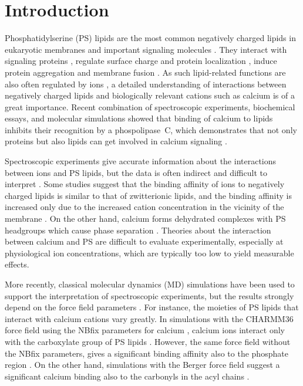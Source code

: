 \documentclass[journal=jctcce,manuscript=article]{achemso}
\begin{document}
 
 
\section{Introduction} 

Phosphatidylserine (PS) lipids are the most common negatively charged lipids in eukaryotic membranes
and important signaling molecules \cite{lemmon08,leventis10,li14}.
They interact with signaling proteins \cite{leventis10},
regulate surface charge and protein localization \cite{yeung08}, 
induce protein aggregation \cite{zhao04,gorbenko06} and membrane fusion \cite{wilschut1981calcium, papahadjopoulos90, verma2018cell}.
As such lipid-related functions are also often regulated by ions \cite{leventis10},
a detailed understanding of interactions between negatively charged lipids and biologically relevant cations such as calcium is of a great importance.
Recent combination of spectroscopic experiments, biochemical essays, and molecular simulations showed that binding of
calcium to  lipids inhibits their recognition by a phospolipase~C, 
which demonstrates that not only proteins but also lipids can get involved in calcium signaling \cite{Bilkova2017Calcium}.

Spectroscopic experiments give accurate information about the
interactions between ions and PS lipids, but the data is often indirect and difficult to
interpret \cite{hauser77,kurland79,eisenberg79,hauser83,dluhy83,hauser85,feigenson86,mattai89,roux90,roux91}.
Some studies suggest that the
binding affinity of ions to negatively charged lipids is similar to that of zwitterionic lipids,
and the binding affinity is increased only due to the increased cation
concentration in the vicinity of the membrane \cite{seelig90,sinn06}.
On the other hand, calcium forms dehydrated complexes with PS headgroups
which cause phase separation \cite{hauser77,kurland79,hauser85,feigenson86,mattai89,roux90,roux91,boettcher11}.
Theories about the interaction between calcium and PS 
are difficult to evaluate experimentally,
especially at physiological ion concentrations,
which are typically too low to yield measurable effects.

More recently, classical molecular dynamics (MD) simulations
have been used to support the interpretation of spectroscopic experiments,
but the results strongly depend on the force field parameters \cite{boettcher11,kucerka14,melcrova16,hallock18,valentine18}.
For instance, the moieties of PS lipids that interact with calcium cations vary greatly.
In simulations with the CHARMM36 force field \cite{klauda10,venable13} using the NBfix parameters for calcium \cite{kim16}, 
calcium ions interact only with the carboxylate group of PS lipids \cite{valentine18}.
However, the same force field without the NBfix parameters, gives a significant binding affinity also to the phosphate region \cite{hallock18}.
On the other hand, simulations with the Berger force field \cite{berger97,mukhopadhyay04}
suggest a significant calcium binding also to the carbonyls in the acyl chains \cite{melcrova16}.
\end{document}
